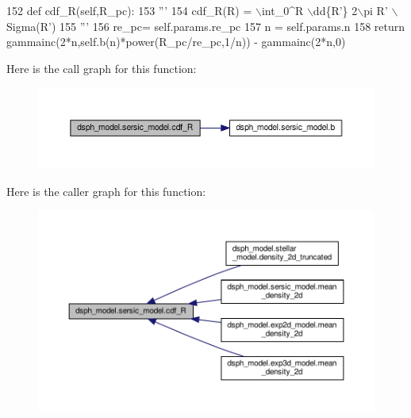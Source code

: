 \begin{DoxyCode}
152     \textcolor{keyword}{def }cdf\_R(self,R\_pc):
153         \textcolor{stringliteral}{'''}
154 \textcolor{stringliteral}{        cdf\_R(R) = \(\backslash\)int\_0^R \(\backslash\)dd\{R'\} 2\(\backslash\)pi R' \(\backslash\)Sigma(R')}
155 \textcolor{stringliteral}{        '''}
156         re\_pc= self.params.re\_pc
157         n = self.params.n
158         \textcolor{keywordflow}{return} gammainc(2*n,self.b(n)*power(R\_pc/re\_pc,1/n)) - gammainc(2*n,0)
\end{DoxyCode}
Here is the call graph for this function\+:\nopagebreak
\begin{figure}[H]
\begin{center}
\leavevmode
\includegraphics[width=350pt]{d0/de9/classdsph__model_1_1sersic__model_a68a272af30ef7e30ddaa70b076dc2818_cgraph}
\end{center}
\end{figure}
Here is the caller graph for this function\+:\nopagebreak
\begin{figure}[H]
\begin{center}
\leavevmode
\includegraphics[width=350pt]{d0/de9/classdsph__model_1_1sersic__model_a68a272af30ef7e30ddaa70b076dc2818_icgraph}
\end{center}
\end{figure}
\mbox{\label{classdsph__model_1_1sersic__model_afd0e257748b9a1b46c2f5443e3214523}} 

